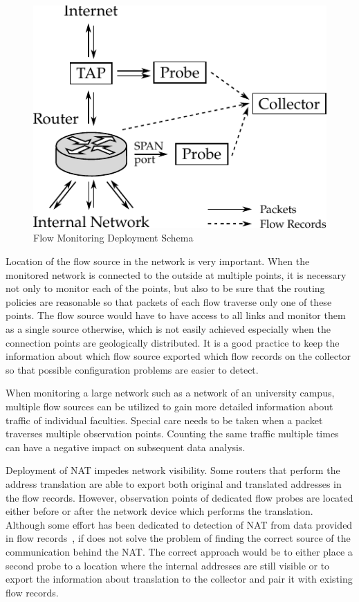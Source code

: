 \begin{figure}[t!]
  \begin{center}
    \includegraphics[]{figures/flow-monitoring-deployment}
  \end{center}
  \caption{Flow Monitoring Deployment Schema}
  \label{fig:flow_monitoring_deployment}
\end{figure}

Location of the flow source in the network is very important. When the monitored network is connected to the outside at multiple points, it is necessary not only to monitor each of the points, but also to be sure that the routing policies are reasonable so that packets of each flow traverse only one of these points. The flow source would have to have access to all links and monitor them as a single source otherwise, which is not easily achieved especially when the connection points are geologically distributed. It is a good practice to keep the information about which flow source exported which flow records on the collector so that possible configuration problems are easier to detect.

When monitoring a large network such as a network of an university campus, multiple flow sources can be utilized to gain more detailed information about traffic of individual faculties. Special care needs to be taken when a packet traverses multiple observation points. Counting the same traffic multiple times can have a negative impact on subsequent data analysis.

Deployment of NAT impedes network visibility. Some routers that perform the address translation are able to export both original and translated addresses in the flow records. However, observation points of dedicated flow probes are located either before or after the network device which performs the translation. Although some effort has been dedicated to detection of NAT from data provided in flow records~\cite{Abt-2013-Passive, Krmicek-2009-Netflow}, if does not solve the problem of finding the correct source of the communication behind the NAT. The correct approach would be to either place a second probe to a location where the internal addresses are still visible or to export the information about translation to the collector and pair it with existing flow records.


